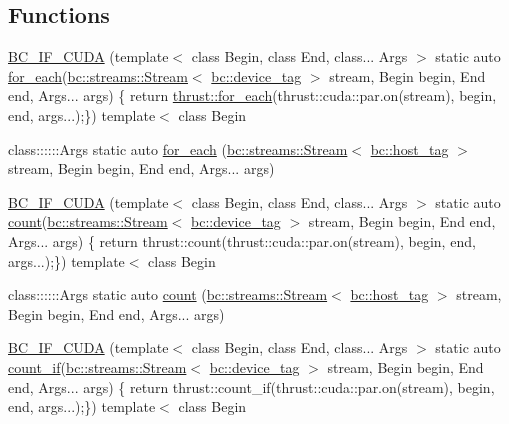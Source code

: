 \subsection*{Functions}
\begin{DoxyCompactItemize}
\item 
\hyperlink{namespacebc_1_1algorithms_a1fca691445bcc8682def79b07442d781}{B\+C\+\_\+\+I\+F\+\_\+\+C\+U\+DA} (template$<$ class Begin, class End, class... Args $>$ static auto \hyperlink{namespacebc_1_1algorithms_a950818852a34ad7c112c6d432b62ab56}{for\+\_\+each}(\hyperlink{classbc_1_1streams_1_1Stream}{bc\+::streams\+::\+Stream}$<$ \hyperlink{structbc_1_1device__tag}{bc\+::device\+\_\+tag} $>$ stream, Begin begin, End end, Args... args) \{ return \hyperlink{tensor__iteralgos_8h_a20824e5505174a5ef93a96bf5a483350}{thrust\+::for\+\_\+each}(thrust\+::cuda\+::par.\+on(stream), begin, end, args...);\}) template$<$ class Begin
\item 
class\+::::::\+Args static auto \hyperlink{namespacebc_1_1algorithms_a950818852a34ad7c112c6d432b62ab56}{for\+\_\+each} (\hyperlink{classbc_1_1streams_1_1Stream}{bc\+::streams\+::\+Stream}$<$ \hyperlink{structbc_1_1host__tag}{bc\+::host\+\_\+tag} $>$ stream, Begin begin, End end, Args... args)
\item 
\hyperlink{namespacebc_1_1algorithms_acbea96c6be1f3640ba2a0c16762f8518}{B\+C\+\_\+\+I\+F\+\_\+\+C\+U\+DA} (template$<$ class Begin, class End, class... Args $>$ static auto \hyperlink{namespacebc_1_1algorithms_ae6f41bde30aacfe8b76975e715c52bd7}{count}(\hyperlink{classbc_1_1streams_1_1Stream}{bc\+::streams\+::\+Stream}$<$ \hyperlink{structbc_1_1device__tag}{bc\+::device\+\_\+tag} $>$ stream, Begin begin, End end, Args... args) \{ return thrust\+::count(thrust\+::cuda\+::par.\+on(stream), begin, end, args...);\}) template$<$ class Begin
\item 
class\+::::::\+Args static auto \hyperlink{namespacebc_1_1algorithms_ae6f41bde30aacfe8b76975e715c52bd7}{count} (\hyperlink{classbc_1_1streams_1_1Stream}{bc\+::streams\+::\+Stream}$<$ \hyperlink{structbc_1_1host__tag}{bc\+::host\+\_\+tag} $>$ stream, Begin begin, End end, Args... args)
\item 
\hyperlink{namespacebc_1_1algorithms_a2527ffbb014b4d45d414b3632b05df4f}{B\+C\+\_\+\+I\+F\+\_\+\+C\+U\+DA} (template$<$ class Begin, class End, class... Args $>$ static auto \hyperlink{namespacebc_1_1algorithms_aa3027db1b5fa7bf7ced1841792da560a}{count\+\_\+if}(\hyperlink{classbc_1_1streams_1_1Stream}{bc\+::streams\+::\+Stream}$<$ \hyperlink{structbc_1_1device__tag}{bc\+::device\+\_\+tag} $>$ stream, Begin begin, End end, Args... args) \{ return thrust\+::count\+\_\+if(thrust\+::cuda\+::par.\+on(stream), begin, end, args...);\}) template$<$ class Begin

\end{DoxyCompactItemize}
